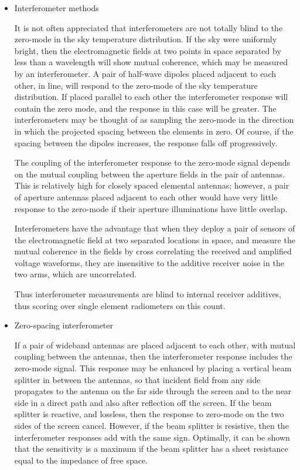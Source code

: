\begin{itemize}
  \item
  Interferometer methods
  
  It is not often appreciated that interferometers are not totally blind to the zero-mode in the sky temperature distribution.  If the sky were uniformly bright, then the electromagnetic fields at two points in space separated by less than a wavelength will show mutual coherence, which may be measured by an interferometer.  A pair of half-wave dipoles placed adjacent to each other, in line, will respond to the zero-mode of the sky temperature distribution.  If placed parallel to each other the interferometer response will contain the zero mode, and the response in this case will be greater.  The interferometers may be thought of as sampling the zero-mode in the direction in which the projected spacing between the elements in zero.  Of course, if the spacing between the dipoles increases, the response falls off progressively.
  
  The coupling of the interferometer response to the zero-mode signal depends on the mutual coupling between the aperture fields in the pair of antennas.  This is relatively high for closely spaced elemental antennas; however, a pair of aperture antennas placed adjacent to each other would have very little response to the zero-mode if their aperture illuminations have little overlap.
  
  Interferometers have the advantage that when they deploy a pair of sensors of the electromagnetic field at two separated locations in space, and measure the mutual coherence in the fields by cross correlating the received and amplified voltage waveforms, they are insensitive to the additive receiver noise in the two arms, which are uncorrelated.  
  
  Thus interferometer measurements are blind to internal receiver additives, thus scoring over single element radiometers on this count.
  
  \item
  Zero-spacing interferometer
  
  If a pair of wideband antennas are placed adjacent to each other, with mutual coupling between the antennas, then the interferometer response includes the zero-mode signal.  This response may be enhanced by placing a vertical beam splitter in between the antennas, so that incident field from any side propagates to the antenna on the far side through the screen and to the near side in a direct path and also after reflection off the screen.  If the beam splitter is reactive, and lossless, then the response to zero-mode on the two sides of the screen cancel.  However, if the beam splitter is resistive, then the interferometer responses add with the same sign.  Optimally, it can be shown that the sensitivity is a maximum if the beam splitter has a sheet resistance equal to the impedance of free space.  
  

\end{itemize}
